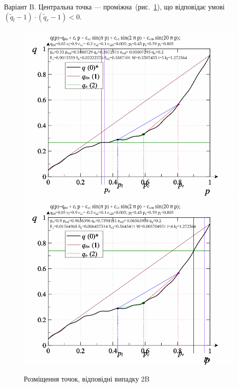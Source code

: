 Варіант B.\label{atu:d:p_eql_2B} %
%
Центральна точка --- проміжна~(рис.~\ref{atu:f:pq_2B}),
що відповідає умові
$ ( \tilde{q}_l -1 ) \cdot ( \tilde{q}_r -1 ) < 0 $.

\begin{figure}[htb!]
  \begin{center}
    \includegraphics[width=49\TW]{p/pq_sin-p_pq_po=033.png}
    \hfill
    \includegraphics[width=49\TW]{p/pq_sin-p_pq_po=090.png}
  \end{center}
  \caption{Розміщення точок, відповідні випадку 2B}
  \label{atu:f:pq_2B}
\end{figure}

